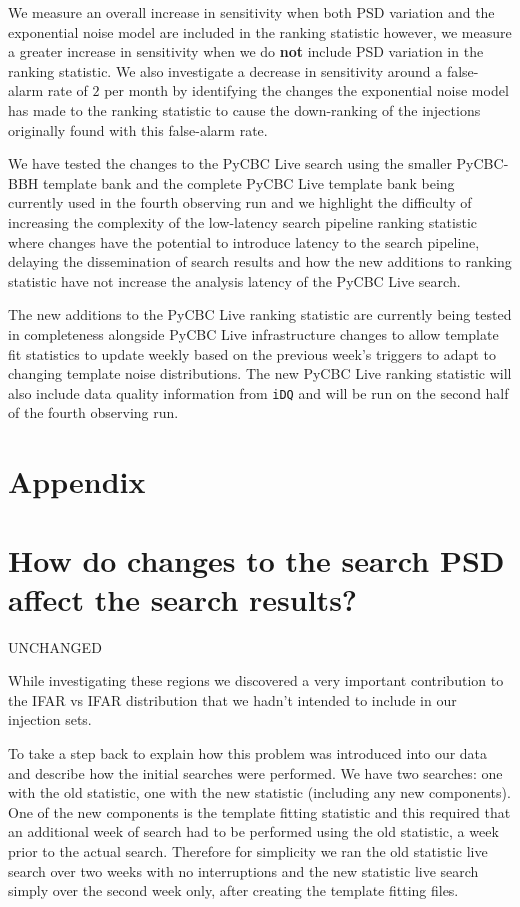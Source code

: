 We measure an overall increase in sensitivity when both PSD variation and the exponential noise model are included in the ranking statistic however, we measure a greater increase in sensitivity when we do \textbf{not} include PSD variation in the ranking statistic. We also investigate a decrease in sensitivity around a false-alarm rate of $2$ per month by identifying the changes the exponential noise model has made to the ranking statistic to cause the down-ranking of the injections originally found with this false-alarm rate.

We have tested the changes to the PyCBC Live search using the smaller PyCBC-BBH template bank and the complete PyCBC Live template bank being currently used in the fourth observing run and we highlight the difficulty of increasing the complexity of the low-latency search pipeline ranking statistic where changes have the potential to introduce latency to the search pipeline, delaying the dissemination of search results and how the new additions to ranking statistic have not increase the analysis latency of the PyCBC Live search.

The new additions to the PyCBC Live ranking statistic are currently being tested in completeness alongside PyCBC Live infrastructure changes to allow template fit statistics to update weekly based on the previous week's triggers to adapt to changing template noise distributions. The new PyCBC Live ranking statistic will also include data quality information from \verb|iDQ| and will be run on the second half of the fourth observing run.




\section*{Appendix}
\section{\label{5:sec:diff-start-times}How do changes to the search PSD affect the search results?}

UNCHANGED

While investigating these regions we discovered a very important contribution to the IFAR vs IFAR distribution that we hadn't intended to include in our injection sets. 

To take a step back to explain how this problem was introduced into our data and describe how the initial searches were performed. We have two searches: one with the old statistic, one with the new statistic (including any new components). One of the new components is the template fitting statistic and this required that an additional week of search had to be performed using the old statistic, a week prior to the actual search. Therefore for simplicity we ran the old statistic live search over two weeks with no interruptions and the new statistic live search simply over the second week only, after creating the template fitting files.

